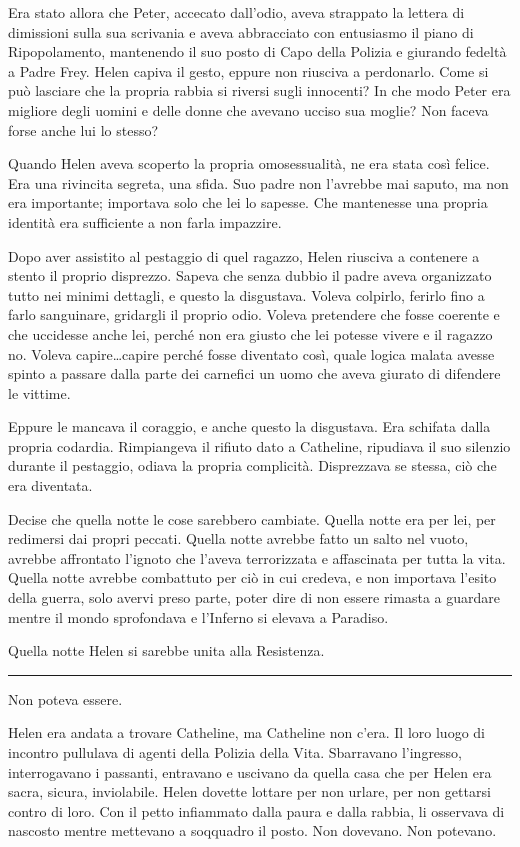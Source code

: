 Era stato allora che Peter, accecato dall'odio, aveva strappato la lettera di dimissioni sulla sua
scrivania e aveva abbracciato con entusiasmo il piano di Ripopolamento, mantenendo il suo posto di
Capo della Polizia e giurando fedeltà a Padre Frey. Helen capiva il gesto, eppure non riusciva a
perdonarlo. Come si può lasciare che la propria rabbia si riversi sugli innocenti? In che modo Peter
era migliore degli uomini e delle donne che avevano ucciso sua moglie? Non faceva forse anche lui lo
stesso?

Quando Helen aveva scoperto la propria omosessualità, ne era stata così felice. Era una rivincita
segreta, una sfida. Suo padre non l'avrebbe mai saputo, ma non era importante; importava solo che
lei lo sapesse. Che mantenesse una propria identità era sufficiente a non farla impazzire.

Dopo aver assistito al pestaggio di quel ragazzo, Helen riusciva a contenere a stento il proprio
disprezzo. Sapeva che senza dubbio il padre aveva organizzato tutto nei minimi dettagli, e questo la
disgustava. Voleva colpirlo, ferirlo fino a farlo sanguinare, gridargli il proprio odio. Voleva
pretendere che fosse coerente e che uccidesse anche lei, perché non era giusto che lei potesse
vivere e il ragazzo no. Voleva capire\dots capire perché fosse diventato così, quale logica malata
avesse spinto a passare dalla parte dei carnefici un uomo che aveva giurato di difendere le vittime.

Eppure le mancava il coraggio, e anche questo la disgustava. Era schifata dalla propria codardia.
Rimpiangeva il rifiuto dato a Catheline, ripudiava il suo silenzio durante il pestaggio, odiava la
propria complicità. Disprezzava se stessa, ciò che era diventata.

Decise che quella notte le cose sarebbero cambiate. Quella notte era per lei, per redimersi dai
propri peccati. Quella notte avrebbe fatto un salto nel vuoto, avrebbe affrontato l'ignoto che
l'aveva terrorizzata e affascinata per tutta la vita. Quella notte avrebbe combattuto per ciò in cui
credeva, e non importava l'esito della guerra, solo avervi preso parte, poter dire di non essere
rimasta a guardare mentre il mondo sprofondava e l'Inferno si elevava a Paradiso.

Quella notte Helen si sarebbe unita alla Resistenza.

\plainbreak{1}

Non poteva essere.

Helen era andata a trovare Catheline, ma Catheline non c'era. Il loro luogo di incontro pullulava di
agenti della Polizia della Vita. Sbarravano l'ingresso, interrogavano i passanti, entravano e
uscivano da quella casa che per Helen era sacra, sicura, inviolabile. Helen dovette lottare per non
urlare, per non gettarsi contro di loro. Con il petto infiammato dalla paura e dalla rabbia, li
osservava di nascosto mentre mettevano a soqquadro il posto. Non dovevano. Non potevano.

